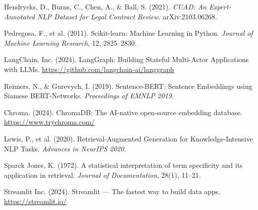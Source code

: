 \documentclass[12pt,a4paper]{article}
\begin{document}
\begin{enumerate}[leftmargin=1.5cm, label={[\arabic*]}]
    \item Hendrycks, D., Burns, C., Chen, A., \& Ball, S. (2021). \textit{CUAD: An
    Expert-Annotated NLP Dataset for Legal Contract Review}. arXiv:2103.06268.

    \item Pedregosa, F., et al. (2011). Scikit-learn: Machine Learning in Python.
    \textit{Journal of Machine Learning Research}, 12, 2825--2830.

    \item LangChain, Inc. (2024). LangGraph: Building Stateful Multi-Actor
    Applications with LLMs. \url{https://github.com/langchain-ai/langgraph}

    \item Reimers, N., \& Gurevych, I. (2019). Sentence-BERT: Sentence Embeddings
    using Siamese BERT-Networks. \textit{Proceedings of EMNLP 2019}.

    \item Chroma. (2024). ChromaDB: The AI-native open-source embedding database.
    \url{https://www.trychroma.com/}

    \item Lewis, P., et al. (2020). Retrieval-Augmented Generation for
    Knowledge-Intensive NLP Tasks. \textit{Advances in NeurIPS 2020}.

    \item Sparck Jones, K. (1972). A statistical interpretation of term specificity
    and its application in retrieval. \textit{Journal of Documentation}, 28(1), 11--21.

    \item Streamlit Inc. (2024). Streamlit --- The fastest way to build data apps.
    \url{https://streamlit.io/}
\end{enumerate}
\end{document}
